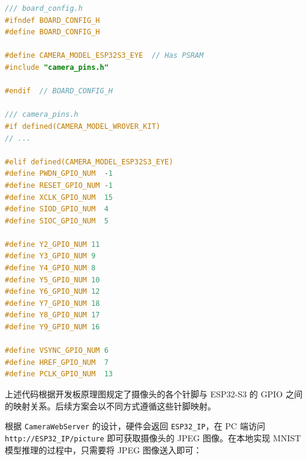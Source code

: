 \documentclass[a4paper,12pt]{ctexart}
\begin{document}
\begin{lstlisting}[language=C++,caption={定义针脚}]
/// board_config.h
#ifndef BOARD_CONFIG_H
#define BOARD_CONFIG_H

#define CAMERA_MODEL_ESP32S3_EYE  // Has PSRAM
#include "camera_pins.h"

#endif  // BOARD_CONFIG_H

/// camera_pins.h
#if defined(CAMERA_MODEL_WROVER_KIT)
// ...

#elif defined(CAMERA_MODEL_ESP32S3_EYE)
#define PWDN_GPIO_NUM  -1
#define RESET_GPIO_NUM -1
#define XCLK_GPIO_NUM  15
#define SIOD_GPIO_NUM  4
#define SIOC_GPIO_NUM  5

#define Y2_GPIO_NUM 11
#define Y3_GPIO_NUM 9
#define Y4_GPIO_NUM 8
#define Y5_GPIO_NUM 10
#define Y6_GPIO_NUM 12
#define Y7_GPIO_NUM 18
#define Y8_GPIO_NUM 17
#define Y9_GPIO_NUM 16

#define VSYNC_GPIO_NUM 6
#define HREF_GPIO_NUM  7
#define PCLK_GPIO_NUM  13
\end{lstlisting}

上述代码根据开发板原理图规定了摄像头的各个针脚与 ESP32-S3 的 GPIO 之间的映射关系。后续方案会以不同方式遵循这些针脚映射。

根据 \texttt{CameraWebServer} 的设计，硬件会返回 \texttt{ESP32\_IP}，在 PC 端访问 \texttt{http://ESP32\_IP/picture} 即可获取摄像头的 JPEG 图像。在本地实现 MNIST 模型推理的过程中，只需要将 JPEG 图像送入即可：
\end{document}
